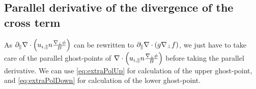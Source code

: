 \subsection{Parallel derivative of the divergence of the cross term}
%
As $\partial_\|\nabla\cdot \left( u_{i,\|}n \frac{\nabla_\perp \phi}{B}\right)$ can be rewritten to $\partial_\|\nabla\cdot(g\nabla_\perp f)$, we just have to take care of the parallel ghost-points of $\nabla\cdot \left( u_{i,\|}n \frac{\nabla_\perp \phi}{B}\right)$ before taking the parallel derivative.
We can use \cref{eq:extraPolUp} for calculation of the upper ghost-point, and \cref{eq:extraPolDown}  for calculation of the lower ghost-point.
